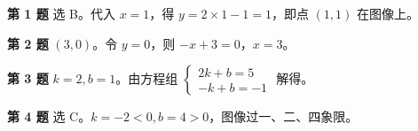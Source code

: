 \documentclass{exam-zh}
\begin{document}
\begin{keyideabox}
  \textbf{第 1 题}
  选 B。代入 $x=1$，得 $y=2\times1-1=1$，即点 $(1,1)$ 在图像上。
\end{keyideabox}




\begin{keyideabox}
  \textbf{第 2 题}
  $(3,0)$。令 $y=0$，则 $-x+3=0$，$x=3$。
\end{keyideabox}




\begin{keyideabox}
  \textbf{第 3 题}
  $k=2, b=1$。由方程组 $\begin{cases}2k+b=5\\-k+b=-1\end{cases}$ 解得。
\end{keyideabox}




\begin{keyideabox}
  \textbf{第 4 题}
  选 C。$k=-2<0, b=4>0$，图像过一、二、四象限。
\end{keyideabox}
\end{document}

